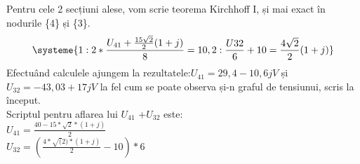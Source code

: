 \documentclass[12pt,twoside]{article}
\begin{document}
Pentru cele 2 secțiuni alese, vom scrie teorema Kirchhoff I, și mai exact în nodurile
\{4\} și \{3\}.
\begin{equation}
\systeme{{1}:2*\frac{U_{41}+\frac{15\sqrt{2}}{2}(1+j)}{8}=10,
{2}:\frac{U{32}}{6}+10=\frac{4\sqrt{2}}{2}(1+j)}
\end{equation}
Efectuând calculele ajungem la rezultatele:$U_{41}=29,4-10,6j V$ și \\ $U_{32}=-43,03+17jV$ la fel cum se poate observa și-n graful de tensiunui, scris la început.\\
Scriptul pentru aflarea lui $U_{41}$ +$U_{32}$ este:\\
$U_{41}=\frac{40-15*\sqrt{2}*(1+j)}{2} $
\\
$U_{32}=(\frac{4*\sqrt(2)*(1+j)}{2}-10)*6$
\end{document}

